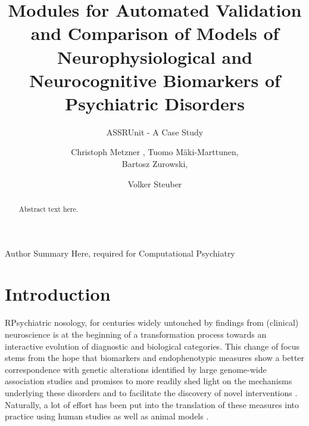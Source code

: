 \documentclass[CompPsych]{stjour}
\begin{document}
\title[ASSRUnit]{Modules for Automated Validation and Comparison of Models of Neurophysiological and Neurocognitive Biomarkers of Psychiatric Disorders}
\subtitle{ASSRUnit - A Case Study} %
% 
% 
% 
\author[Christoph Metzner, Tuomo M\"aki-Marttunen, Bartosz Zurowski,\and Volker Steuber]
{Christoph Metzner ,
Tuomo M\"aki-Marttunen, \\
Bartosz Zurowski,\and Volker Steuber}

% 
% 

% 
% 
% 
% 
% 
% 
\begin{abstract}
Abstract text here.
\end{abstract}
% 
\begin{authorsummary}
Author Summary Here, required for Computational Psychiatry
\end{authorsummary}


\section{Introduction}
RPsychiatric nosology, for centuries widely untouched by findings from (clinical) neuroscience is at the beginning of a transformation process \cite{Friston2017} 
towards an interactive evolution of diagnostic and biological categories. This change of focus stems from the hope
that biomarkers and endophenotypic measures show a better correspondence with genetic 
alterations identified by large genome-wide association studies \cite{Meyer2006} and promises to more readily shed light on the mechanisms underlying
these disorders and to facilitate the discovery of novel interventions \cite{Siekmeier2015}.
Naturally, a lot of effort has been put into the translation of these measures into practice using human studies \cite{Perlis2011}
as well as animal models \cite{Markou2009}.
\end{document}
